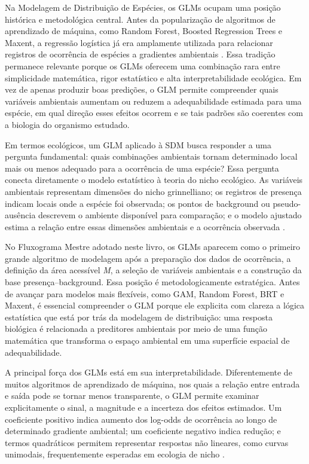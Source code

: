 Na Modelagem de Distribuição de Espécies, os GLMs ocupam uma posição histórica e metodológica central. Antes da popularização de algoritmos de aprendizado de máquina, como Random Forest, Boosted Regression Trees e Maxent, a regressão logística já era amplamente utilizada para relacionar registros de ocorrência de espécies a gradientes ambientais \citep{guisan2000predictive,franklin2010mapping,guisan2017habitat}. Essa tradição permanece relevante porque os GLMs oferecem uma combinação rara entre simplicidade matemática, rigor estatístico e alta interpretabilidade ecológica. Em vez de apenas produzir boas predições, o GLM permite compreender quais variáveis ambientais aumentam ou reduzem a adequabilidade estimada para uma espécie, em qual direção esses efeitos ocorrem e se tais padrões são coerentes com a biologia do organismo estudado.

Em termos ecológicos, um GLM aplicado à SDM busca responder a uma pergunta fundamental: quais combinações ambientais tornam determinado local mais ou menos adequado para a ocorrência de uma espécie? Essa pergunta conecta diretamente o modelo estatístico à teoria do nicho ecológico. As variáveis ambientais representam dimensões do nicho grinnelliano; os registros de presença indicam locais onde a espécie foi observada; os pontos de background ou pseudo-ausência descrevem o ambiente disponível para comparação; e o modelo ajustado estima a relação entre essas dimensões ambientais e a ocorrência observada \citep{guisan2000predictive,elith2009species,peterson2011ecological}.

No Fluxograma Mestre adotado neste livro, os GLMs aparecem como o primeiro grande algoritmo de modelagem após a preparação dos dados de ocorrência, a definição da área acessível \textit{M}, a seleção de variáveis ambientais e a construção da base presença--background. Essa posição é metodologicamente estratégica. Antes de avançar para modelos mais flexíveis, como GAM, Random Forest, BRT e Maxent, é essencial compreender o GLM porque ele explicita com clareza a lógica estatística que está por trás da modelagem de distribuição: uma resposta biológica é relacionada a preditores ambientais por meio de uma função matemática que transforma o espaço ambiental em uma superfície espacial de adequabilidade.

A principal força dos GLMs está em sua interpretabilidade. Diferentemente de muitos algoritmos de aprendizado de máquina, nos quais a relação entre entrada e saída pode se tornar menos transparente, o GLM permite examinar explicitamente o sinal, a magnitude e a incerteza dos efeitos estimados. Um coeficiente positivo indica aumento dos log-odds de ocorrência ao longo de determinado gradiente ambiental; um coeficiente negativo indica redução; e termos quadráticos permitem representar respostas não lineares, como curvas unimodais, frequentemente esperadas em ecologia de nicho \citep{austin2002spatial,guisan2002generalized,zuur2009mixed}.

